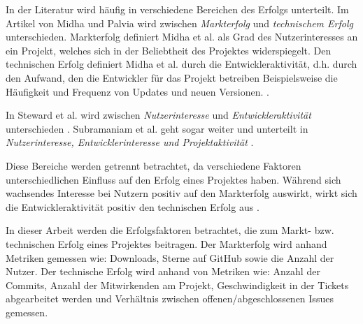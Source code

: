

In der Literatur wird häufig in verschiedene Bereichen des Erfolgs unterteilt.
Im Artikel von Midha und Palvia wird zwischen \textit{Markterfolg} und \textit{technischem Erfolg} unterschieden.
Markterfolg definiert Midha et al.
als Grad des Nutzerinteresses an ein Projekt, %
welches sich in der Beliebtheit des Projektes widerspiegelt.
Den technischen Erfolg definiert Midha et al.
durch die Entwickleraktivität, d.h. durch den Aufwand, den die Entwickler für das Projekt betreiben %
Beispielsweise die Häufigkeit und Frequenz von Updates und neuen Versionen.
\cite{midhaFactorsAffectingSuccess2012}. %


In Steward et al. wird zwischen \textit{Nutzerinteresse} und \textit{Entwickleraktivität} unterschieden
\cite{stewartImpactsLicenseChoice2006a}. %
Subramaniam et al. geht sogar weiter und unterteilt in \textit{Nutzerinteresse, Entwicklerinteresse und Projektaktivität}
\cite{subramaniamDeterminantsOpenSource2009}. %

Diese Bereiche werden getrennt betrachtet, da verschiedene Faktoren unterschiedlichen Einfluss
auf den Erfolg eines Projektes haben.
Während sich wachsendes Interesse bei Nutzern positiv auf den Markterfolg auswirkt,
wirkt sich die Entwickleraktivität positiv den technischen Erfolg aus
\cite{midhaFactorsAffectingSuccess2012, %
    stewartImpactsLicenseChoice2006a}. %

In dieser Arbeit werden die Erfolgsfaktoren betrachtet, die zum Markt- bzw. technischen Erfolg
eines Projektes beitragen.
Der Markterfolg wird anhand Metriken gemessen wie:
Downloads, Sterne auf GitHub sowie die Anzahl der Nutzer.
Der technische Erfolg wird anhand von Metriken wie:
Anzahl der Commits, Anzahl der Mitwirkenden am Projekt,
Geschwindigkeit in der Tickets abgearbeitet werden und Verhältnis zwischen offenen/abgeschlossenen Issues gemessen.


